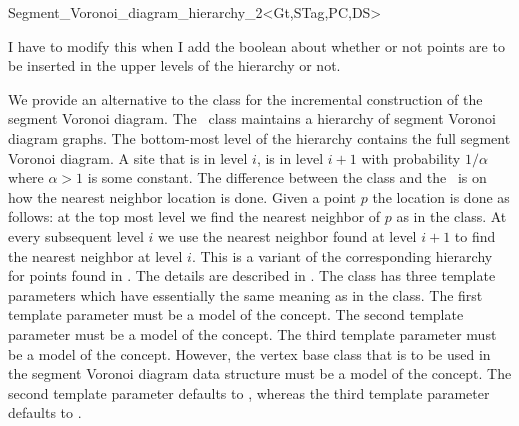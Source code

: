 


\begin{ccRefClass}{Segment_Voronoi_diagram_hierarchy_2<Gt,STag,PC,DS>}

{\sc I have to modify this when I add the boolean about whether or not
  points are to be inserted in the upper levels of the hierarchy or
  not.}

\ccDefinition

We provide an alternative to the class
 for the incremental
construction of the segment Voronoi diagram. The \ccRefName\ class
maintains a hierarchy of segment Voronoi diagram graphs. The
bottom-most level of the hierarchy contains the full segment Voronoi
diagram. A site that is in level $i$, is in level $i+1$ with
probability $1/\alpha$ where $\alpha > 1$ is some constant. The
difference between the  class
and the \ccRefName\ is on how the nearest neighbor location is
done. Given a point $p$ the location is done as follows: at the top
most level we find the nearest neighbor of $p$ as in the
 class. At every subsequent
level $i$ we use the nearest neighbor found at level $i+1$ to find the
nearest neighbor at level $i$. This is a variant of the corresponding
hierarchy for points found in \cite{d-iirdt-98}. The details are
described in \cite{k-peasv-04}.
%
The class has three template parameters which have essentially the same
meaning as in the  class. The
first template parameter must be a model of the
 concept.
The second template parameter must be a model of the
 concept. The third template parameter must be a
model of the 
concept. However, the vertex base class that is to be used in the
segment Voronoi diagram data structure must
be a model of the 
concept. The second template parameter defaults to
, whereas the third
template parameter defaults to
. 


\end{ccRefClass}
